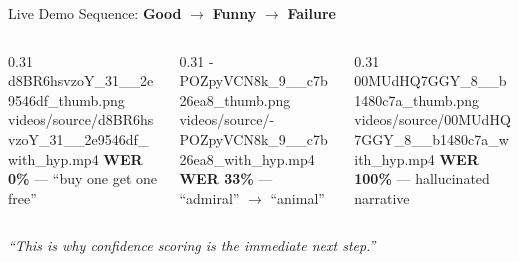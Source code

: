 \begin{frame}{Live Demo}
  \vspace{4pt}
  {\small Sequence: \textcolor{ArgosGreen}{\textbf{Good}} $\rightarrow$ \textcolor{ArgosOrange}{\textbf{Funny}} $\rightarrow$ \textcolor{ArgosRed}{\textbf{Failure}}}

  \vspace{8pt}

  \begin{columns}[c]
    \begin{column}{0.31\textwidth}
      \videocaptioned{\linewidth}%
        {d8BR6hsvzoY_31__2e9546df_thumb.png}%
        {videos/source/d8BR6hsvzoY_31__2e9546df_with_hyp.mp4}%
        {\textcolor{ArgosGreen}{\textbf{WER 0\%}} --- ``buy one get one free''}
    \end{column}
    \begin{column}{0.31\textwidth}
      \videocaptioned{\linewidth}%
        {-POZpyVCN8k_9__c7b26ea8_thumb.png}%
        {videos/source/-POZpyVCN8k_9__c7b26ea8_with_hyp.mp4}%
        {\textcolor{ArgosOrange}{\textbf{WER 33\%}} --- ``admiral'' $\rightarrow$ ``animal''}
    \end{column}
    \begin{column}{0.31\textwidth}
      \videocaptioned{\linewidth}%
        {00MUdHQ7GGY_8__b1480c7a_thumb.png}%
        {videos/source/00MUdHQ7GGY_8__b1480c7a_with_hyp.mp4}%
        {\textcolor{ArgosRed}{\textbf{WER 100\%}} --- hallucinated narrative}
    \end{column}
  \end{columns}

  \vspace{10pt}
  \centering
  \textit{``This is why confidence scoring is the immediate next step.''}

\end{frame}

